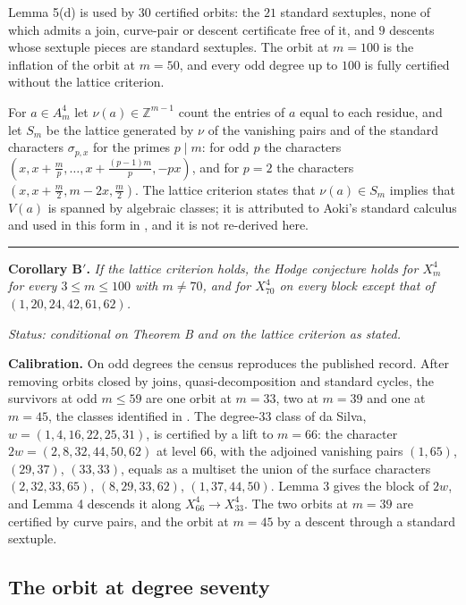 \documentclass[10pt,twocolumn]{article}
\newenvironment{jbox}{\par\vspace{2pt}\noindent\color{accent}\rule{\columnwidth}{0.8pt}\par\vspace{-2pt}\small}{\par\vspace{2pt}}
\begin{document}
Lemma 5(d) is used by \(30\) certified orbits: the \(21\) standard
sextuples, none of which admits a join, curve-pair or descent
certificate free of it, and \(9\) descents whose sextuple pieces are
standard sextuples. The orbit at \(m=100\) is the inflation of the orbit
at \(m=50\), and every odd degree up to \(100\) is fully certified
without the lattice criterion.

For \(a\in A^4_m\) let \(\nu(a)\in\mathbb{Z}^{m-1}\) count the entries
of \(a\) equal to each residue, and let \(S_m\) be the lattice generated
by \(\nu\) of the vanishing pairs and of the standard characters
\(\sigma_{p,x}\) for the primes \(p\mid m\): for odd \(p\) the
characters \((x,x+\tfrac mp,\dots,x+\tfrac{(p-1)m}{p},-px)\), and for
\(p=2\) the characters \((x,x+\tfrac m2,m-2x,\tfrac m2)\). The lattice
criterion states that \(\nu(a)\in S_m\) implies that \(V(a)\) is spanned
by algebraic classes; it is attributed to Aoki's standard calculus and
used in this form in \cite{jumagulov2026}, and it is not re-derived
here.

\begin{jbox}
\color{black}
\textbf{Corollary B$'$.} \textit{If the lattice criterion holds, the Hodge conjecture holds for $X^4_m$ for every $3\le m\le 100$ with $m\neq70$, and for $X^4_{70}$ on every block except that of $(1,20,24,42,61,62)$.}\par\smallskip
\textit{Status: conditional on Theorem B and on the lattice criterion as stated.}
\end{jbox}

\textbf{Calibration.} On odd degrees the census reproduces the published
record. After removing orbits closed by joins, quasi-decomposition and
standard cycles, the survivors at odd \(m\le 59\) are one orbit at
\(m=33\), two at \(m=39\) and one at \(m=45\), the classes identified in
\cite{dasilva2021,jumagulov2026}. The degree-\(33\) class of da Silva,
\(w=(1,4,16,22,25,31)\), is certified by a lift to \(m=66\): the
character \(2w=(2,8,32,44,50,62)\) at level \(66\), with the adjoined
vanishing pairs \((1,65)\), \((29,37)\), \((33,33)\), equals as a
multiset the union of the surface characters \((2,32,33,65)\),
\((8,29,33,62)\), \((1,37,44,50)\). Lemma 3 gives the block of \(2w\),
and Lemma 4 descends it along \(X^4_{66}\to X^4_{33}\). The two orbits
at \(m=39\) are certified by curve pairs, and the orbit at \(m=45\) by a
descent through a standard sextuple.

\hypertarget{the-orbit-at-degree-seventy}{%
\subsection{The orbit at degree
seventy}\label{the-orbit-at-degree-seventy}}
\end{document}
